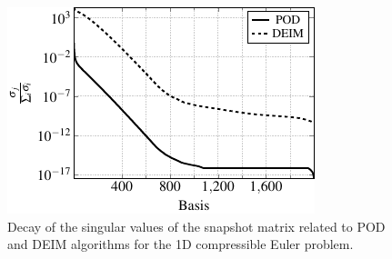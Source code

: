 \begin{figure}
\centering
        \includegraphics[scale=1]{Figures/paper-figure21.pdf}
\caption{Decay of the singular values of the snapshot matrix related to POD and DEIM algorithms for the 1D compressible Euler problem.}
\label{fig:singular_values_decay_1D}
\end{figure}

